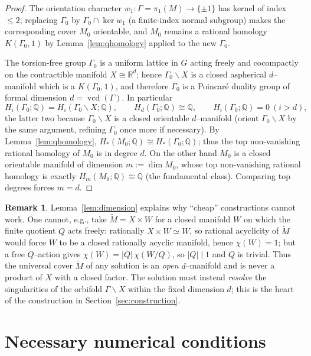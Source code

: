 \documentclass[12pt]{article}
\newcommand{\bR}{\mathbb{R}}
\newcommand{\bQ}{\mathbb{Q}}
\DeclareMathOperator{\vcd}{vcd}
\theoremstyle{definition}
\newtheorem{remark}{Remark}
\begin{document}
\begin{proof}
The orientation character $w_1\colon\Gamma=\pi_1(M)\to\{\pm1\}$ has kernel of
index $\le 2$; replacing $\Gamma_0$ by $\Gamma_0\cap\ker w_1$ (a finite-index
normal subgroup) makes the corresponding cover $M_0$ orientable, and
$M_0$ remains a rational homology $K(\Gamma_0,1)$ by Lemma~\ref{lem:qhomology}
applied to the new $\Gamma_0$.

The torsion-free group $\Gamma_0$ is a uniform lattice in $G$ acting freely and
cocompactly on the contractible manifold $X\cong\bR^d$; hence
$\Gamma_0\backslash X$ is a closed aspherical $d$--manifold which is a
$K(\Gamma_0,1)$, and therefore $\Gamma_0$ is a Poincar\'e duality group of formal
dimension $d=\vcd(\Gamma)$.  In particular
\[
   H_i(\Gamma_0;\bQ)=H_i(\Gamma_0\backslash X;\bQ),\qquad
   H_d(\Gamma_0;\bQ)\cong\bQ,\qquad H_i(\Gamma_0;\bQ)=0\ (i>d),
\]
the latter two because $\Gamma_0\backslash X$ is a closed orientable
$d$--manifold (orient $\Gamma_0\backslash X$ by the same argument, refining
$\Gamma_0$ once more if necessary).  By Lemma~\ref{lem:qhomology},
$H_*(M_0;\bQ)\cong H_*(\Gamma_0;\bQ)$; thus the top non-vanishing rational
homology of $M_0$ is in degree $d$.  On the other hand $M_0$ is a closed
orientable manifold of dimension $m:=\dim M_0$, whose top non-vanishing rational
homology is exactly $H_m(M_0;\bQ)\cong\bQ$ (the fundamental class).  Comparing top
degrees forces $m=d$.
\end{proof}

\begin{remark}\label{rem:noproduct}
Lemma~\ref{lem:dimension} explains why ``cheap'' constructions cannot work.  One
cannot, e.g., take $\widetilde M=X\times W$ for a closed manifold $W$ on which the
finite quotient $Q$ acts freely: rationally $X\times W\simeq W$, so
rational acyclicity of $\widetilde M$ would force $W$ to be a closed rationally
acyclic manifold, hence $\chi(W)=1$; but a free $Q$--action gives
$\chi(W)=|Q|\,\chi(W/Q)$, so $|Q|\mid 1$ and $Q$ is trivial.  Thus the universal
cover $\widetilde M$ of any solution is an \emph{open} $d$--manifold and is never a
product of $X$ with a closed factor.  The solution must instead \emph{resolve} the
singularities of the orbifold $\Gamma\backslash X$ within the fixed dimension $d$;
this is the heart of the construction in Section~\ref{sec:construction}.
\end{remark}

\section{Necessary numerical conditions}\label{sec:necessary}
\end{document}
